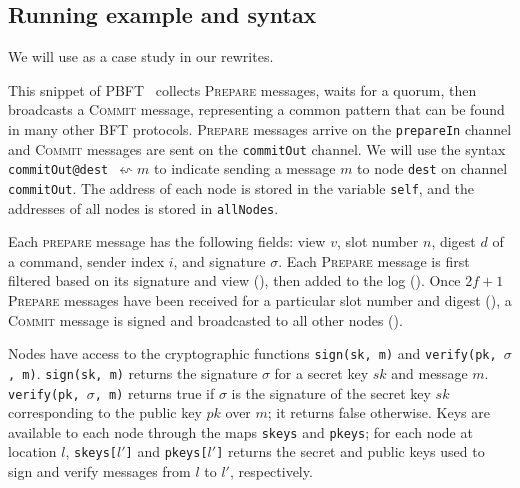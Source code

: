 \subsection{Running example and syntax}
\label{sec:syntax}
We will use  as a case study in our rewrites.

This snippet of PBFT~\cite{pbft} collects \textsc{Prepare} messages, waits for a quorum, then broadcasts a \textsc{Commit} message, representing a common pattern that can be found in many other BFT protocols.
\textsc{Prepare} messages arrive on the \texttt{prepareIn} channel and \textsc{Commit} messages are sent on the \texttt{commitOut} channel.
We will use the syntax \texttt{commitOut@dest $\leftsquigarrow m$} to indicate sending a message $m$ to node \texttt{dest} on channel \texttt{commitOut}.
The address of each node is stored in the variable \texttt{self}, and the addresses of all nodes is stored in \texttt{allNodes}.

Each \textsc{prepare} message has the following fields: view $v$, slot number $n$, digest $d$ of a command, sender index $i$, and signature $\sigma$.
Each \textsc{Prepare} message is first filtered based on its signature and view (), then added to the log ().
Once $2f+1$ \textsc{Prepare} messages have been received for a particular slot number and digest (), a \textsc{Commit} message is signed and broadcasted to all other nodes ().

Nodes have access to the cryptographic functions \texttt{sign(sk, m)} and \texttt{verify(pk, $\sigma$, m)}.
\texttt{sign(sk, m)} returns the signature $\sigma$ for a secret key $sk$ and message $m$.
\texttt{verify(pk, $\sigma$, m)} returns true if $\sigma$ is the signature of the secret key $sk$ corresponding to the public key $pk$ over $m$; it returns false otherwise.
Keys are available to each node through the maps \texttt{skeys} and \texttt{pkeys}; for each node at location $l$, \texttt{skeys[$l'$]} and \texttt{pkeys[$l'$]} returns the secret and public keys used to sign and verify messages from $l$ to $l'$, respectively.


